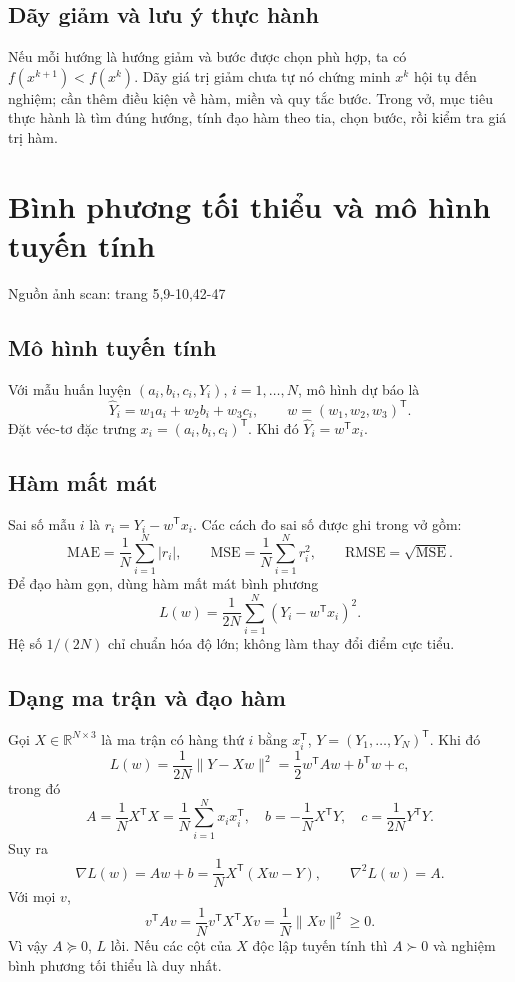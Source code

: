 \documentclass[11pt,a4paper]{article}
\newcommand{\R}{\mathbb{R}}
\newcommand{\grad}{\nabla}
\newcommand{\Hess}{\nabla^2}
\newcommand{\T}{^{\mathsf T}}
\newcommand{\src}[1]{\hfill{\footnotesize\color{gray}Nguồn ảnh scan: trang #1}}
\begin{document}
\subsection{Dãy giảm và lưu ý thực hành}
Nếu mỗi hướng là hướng giảm và bước được chọn phù hợp, ta có \(f(x^{k+1})<f(x^k)\). Dãy giá trị giảm chưa tự nó chứng minh \(x^k\) hội tụ đến nghiệm; cần thêm điều kiện về hàm, miền và quy tắc bước. Trong vở, mục tiêu thực hành là tìm đúng hướng, tính đạo hàm theo tia, chọn bước, rồi kiểm tra giá trị hàm.

\section{Bình phương tối thiểu và mô hình tuyến tính}
\label{sec:least-squares}
\src{5,9-10,42-47}

\subsection{Mô hình tuyến tính}
Với mẫu huấn luyện \((a_i,b_i,c_i,Y_i)\), \(i=1,\ldots,N\), mô hình dự báo là
\[
\widehat Y_i=w_1a_i+w_2b_i+w_3c_i,\qquad
w=(w_1,w_2,w_3)\T.
\]
Đặt véc-tơ đặc trưng \(x_i=(a_i,b_i,c_i)\T\). Khi đó \(\widehat Y_i=w\T x_i\).

\subsection{Hàm mất mát}
Sai số mẫu \(i\) là \(r_i=Y_i-w\T x_i\). Các cách đo sai số được ghi trong vở gồm:
\[
\mathrm{MAE}=\frac1N\sum_{i=1}^N|r_i|,\qquad
\mathrm{MSE}=\frac1N\sum_{i=1}^N r_i^2,\qquad
\mathrm{RMSE}=\sqrt{\mathrm{MSE}}.
\]
Để đạo hàm gọn, dùng hàm mất mát bình phương
\[
L(w)=\frac1{2N}\sum_{i=1}^N(Y_i-w\T x_i)^2.
\]
Hệ số \(1/(2N)\) chỉ chuẩn hóa độ lớn; không làm thay đổi điểm cực tiểu.

\subsection{Dạng ma trận và đạo hàm}
Gọi \(X\in\R^{N\times3}\) là ma trận có hàng thứ \(i\) bằng \(x_i\T\), \(Y=(Y_1,\ldots,Y_N)\T\). Khi đó
\[
L(w)=\frac1{2N}\|Y-Xw\|^2
=\frac12 w\T A w+b\T w+c,
\]
trong đó
\[
A=\frac1N X\T X=\frac1N\sum_{i=1}^N x_ix_i\T,\quad
b=-\frac1N X\T Y,\quad
c=\frac1{2N}Y\T Y.
\]
Suy ra
\[
\grad L(w)=Aw+b=\frac1N X\T(Xw-Y),\qquad
\Hess L(w)=A.
\]
Với mọi \(v\),
\[
v\T A v=\frac1N v\T X\T Xv
=\frac1N\|Xv\|^2\ge0.
\]
Vì vậy \(A\succeq0\), \(L\) lồi. Nếu các cột của \(X\) độc lập tuyến tính thì \(A\succ0\) và nghiệm bình phương tối thiểu là duy nhất.
\end{document}
